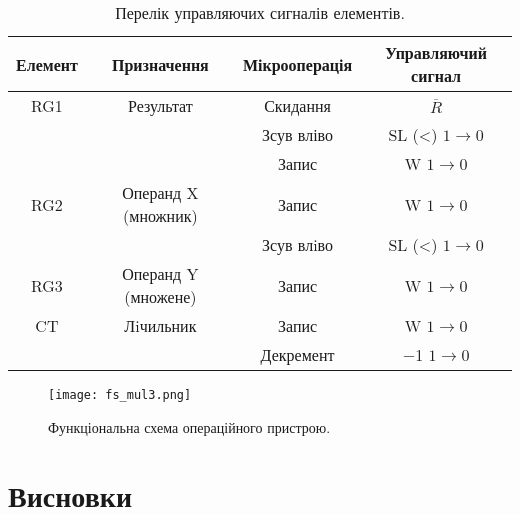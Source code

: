 \documentclass[a4paper, 10pt]{article}
\begin{document}
\begin{table}[h!]
\centering
\begin{tabular}{|c|c|c|c|}
\hline
Елемент & Призначення & Мікрооперація & Управляючий сигнал\\
\hline
RG1 & Результат & Скидання & $\overline{R}$ \\
    &           & Зсув вліво & SL (<) $1\to0$ \\
    &           & Запис & W $1\to0$ \\
\hline
RG2 & Операнд X (множник) & Запис & W $1\to0$ \\
    &                     & Зсув влiво & SL (<) $1\to0$ \\
\hline
RG3 & Операнд Y (множене) & Запис & W $1\to0$ \\
\hline
CT & Лiчильник & Запис & W $1\to0$ \\
   &           & Декремент & $-$1 $1\to0$ \\
\hline
\end{tabular}
\caption{Перелік управляючих сигналів елементів.}
\end{table}

\begin{figure}[H]
\begin{center}
\texttt{[image: fs\_mul3.png]}
\caption{Функціональна схема операційного пристрою.}
\end{center}
\end{figure}

\section{Висновки}
\end{document}
